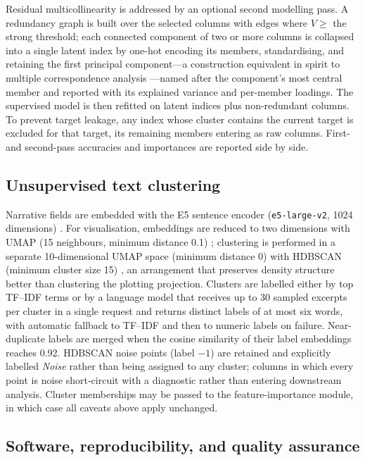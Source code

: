 \documentclass[11pt,a4paper]{article}
\begin{document}
Residual multicollinearity is addressed by an optional second modelling pass. A
redundancy graph is built over the selected columns with edges where
$V \ge$ the strong threshold; each connected component of two or more columns is
collapsed into a single latent index by one-hot encoding its members, standardising,
and retaining the first principal component---a construction equivalent in spirit to
multiple correspondence analysis \cite{greenacre2017}---named after the component's most
central member and reported with its explained variance and per-member loadings.
The supervised model is then refitted on latent indices plus non-redundant columns.
To prevent target leakage, any index whose cluster contains the current target is
excluded for that target, its remaining members entering as raw columns. First- and
second-pass accuracies and importances are reported side by side.

\subsection{Unsupervised text clustering}

Narrative fields are embedded with the E5 sentence encoder
(\texttt{e5-large-v2}, 1024 dimensions) \cite{wang2022}. For visualisation, embeddings
are reduced to two dimensions with UMAP (15 neighbours, minimum distance 0.1)
\cite{mcinnes2018}; clustering is performed in a separate 10-dimensional UMAP space
(minimum distance 0) with HDBSCAN (minimum cluster size 15) \cite{campello2013}, an
arrangement that preserves density structure better than clustering the plotting
projection. Clusters are labelled either by top TF--IDF terms or by a language model
that receives up to 30 sampled excerpts per cluster in a single request and returns
distinct labels of at most six words, with automatic fallback to TF--IDF and then to
numeric labels on failure. Near-duplicate labels are merged when the cosine similarity
of their label embeddings reaches 0.92. HDBSCAN noise points (label $-1$) are retained
and explicitly labelled \emph{Noise} rather than being assigned to any cluster; columns
in which every point is noise short-circuit with a diagnostic rather than entering
downstream analysis. Cluster memberships may be passed to the feature-importance module,
in which case all caveats above apply unchanged.

\subsection{Software, reproducibility, and quality assurance}
\end{document}
